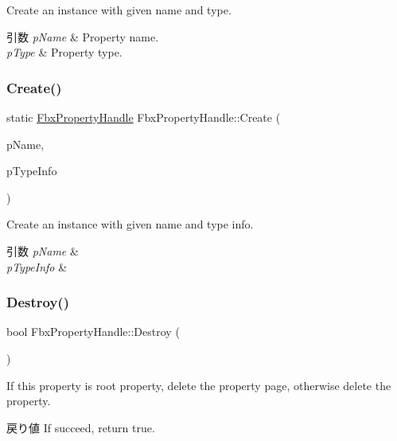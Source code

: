 Create an instance with given name and type. 
\begin{DoxyParams}{引数}
{\em p\+Name} & Property name. \\
\hline
{\em p\+Type} & Property type. \\
\hline
\end{DoxyParams}
\mbox{\label{class_fbx_property_handle_a4f3c6191091b367a05d58984a49e8229}} 
\subsubsection{\texorpdfstring{Create()}{Create()}\hspace{0.1cm}{\footnotesize\ttfamily [4/4]}}
{\footnotesize\ttfamily static \hyperlink{class_fbx_property_handle}{Fbx\+Property\+Handle} Fbx\+Property\+Handle\+::\+Create (\begin{DoxyParamCaption}\item[{const char $\ast$}]{p\+Name,  }\item[{\hyperlink{class_fbx_property_handle}{Fbx\+Property\+Handle}}]{p\+Type\+Info }\end{DoxyParamCaption})\hspace{0.3cm}{\ttfamily [static]}}

Create an instance with given name and type info. 
\begin{DoxyParams}{引数}
{\em p\+Name} & \\
\hline
{\em p\+Type\+Info} & \\
\hline
\end{DoxyParams}
\mbox{\label{class_fbx_property_handle_ae7c07b84a008fbf8395375856a2b303a}} 
\subsubsection{\texorpdfstring{Destroy()}{Destroy()}}
{\footnotesize\ttfamily bool Fbx\+Property\+Handle\+::\+Destroy (\begin{DoxyParamCaption}{ }\end{DoxyParamCaption})}

If this property is root property, delete the property page, otherwise delete the property. \begin{DoxyReturn}{戻り値}
If succeed, return true. 
\end{DoxyReturn}
\mbox{\label{class_fbx_property_handle_a896af2c51a9e9b1c9cc45c20b0c17801}} 
